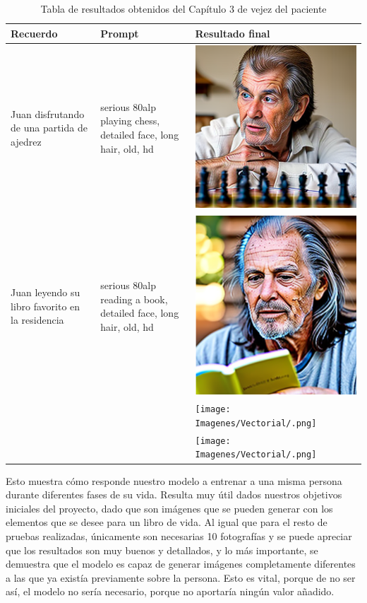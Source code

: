 \begin{table}
	\centering
	\begin{tabular}{>{\centering\arraybackslash}m{5cm} >{\arraybackslash}m{5cm}>{\arraybackslash}m{5cm}}
		\textbf{Recuerdo} & \textbf{Prompt} & \textbf{Resultado final} \\
		\hline
		Juan disfrutando de una partida de ajedrez & serious 80alp playing chess, detailed face, long hair, old, hd & \includegraphics[width = 0.3
		\textwidth]{Imagenes/Vectorial/80alpchess.png}\\
		\hline
		 Juan leyendo su libro favorito en la residencia & serious 80alp reading a book, detailed face, long hair, old, hd & \includegraphics[width = 0.3
		\textwidth]{Imagenes/Vectorial/80alpbook.png}\\
		\hline
		& & \texttt{[image: Imagenes/Vectorial/.png]}\\
		\hline
		&  & \texttt{[image: Imagenes/Vectorial/.png]}\\
		\hline
	\end{tabular}
	\caption{Tabla de resultados obtenidos del Capítulo 3 de vejez del paciente}
	\label{tab:capitulo3librovida}
\end{table}

Esto muestra cómo responde nuestro modelo a entrenar a una misma persona durante diferentes fases de su vida. Resulta muy útil dados nuestros objetivos iniciales del proyecto, dado que son imágenes que se pueden generar con los elementos que se desee para un libro de vida. Al igual que para el resto de pruebas realizadas, únicamente son necesarias 10 fotografías y se puede apreciar que los resultados son muy buenos y detallados, y lo más importante, se demuestra que el modelo es capaz de generar imágenes completamente diferentes a las que ya existía previamente sobre la persona. Esto es vital, porque de no ser así, el modelo no sería necesario, porque no aportaría ningún valor añadido.